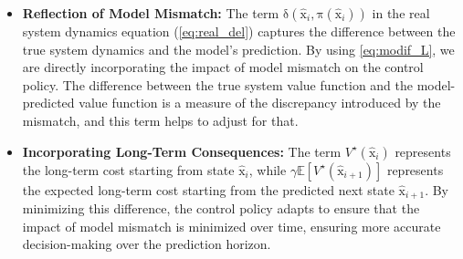 \documentclass[10pt,twocolumn,twoside]{IEEEtran}
\newcommand{\vect}[1]{\ensuremath{\boldsymbol{\mathrm{#1}}}}
\begin{document}
    \begin{itemize}
        \item \textbf{Reflection of Model Mismatch:} 
            The term \(\vect\delta(\hat{\vect{x}}_i, \vect{\pi}(\hat{\vect{x}}_i))\) in the real system dynamics equation (\ref{eq:real_del}) captures the difference between the true system dynamics and the model's prediction. By using \eqref{eq:modif_L}, we are directly incorporating the impact of model mismatch on the control policy. The difference between the true system value function and the model-predicted value function is a measure of the discrepancy introduced by the mismatch, and this term helps to adjust for that.
        
        \item \textbf{Incorporating Long-Term Consequences:} 
            The term \(V^\star(\hat{\vect{x}}_i)\) represents the long-term cost starting from state \(\hat{\vect{x}}_i\), while \(\gamma \mathbb{E}[V^\star(\hat{\vect{x}}_{i+1})]\) represents the expected long-term cost starting from the predicted next state \(\hat{\vect{x}}_{i+1}\). By minimizing this difference, the control policy adapts to ensure that the impact of model mismatch is minimized over time, ensuring more accurate decision-making over the prediction horizon.
    \end{itemize}
\end{document}
